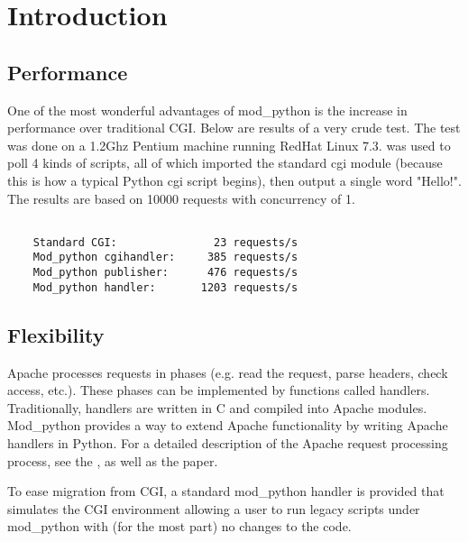 \chapter{Introduction\label{introduction}}

\section{Performance\label{intr-performance}}

One of the most wonderful advantages of mod_python is the increase in
performance over traditional CGI. Below are results of a very crude
test. The test was done on a 1.2Ghz Pentium machine running RedHat
Linux
7.3. 
was used to poll 4 kinds of scripts, all of which imported the
standard cgi module (because this is how a typical Python cgi script
begins), then output a single word "Hello!". The results are based on
10000 requests with concurrency of 1.

\begin{verbatim}

    Standard CGI:               23 requests/s
    Mod_python cgihandler:     385 requests/s
    Mod_python publisher:      476 requests/s
    Mod_python handler:       1203 requests/s

\end{verbatim}         

\section{Flexibility\label{intr-flexibility}}

Apache processes requests in phases (e.g. read the request, parse
headers, check access, etc.). These phases can be implemented by
functions called handlers. Traditionally, handlers are written in C
and compiled into Apache modules. Mod_python provides a way to extend
Apache functionality by writing Apache handlers in Python. For a
detailed description of the Apache request processing process, see the
, as well
as the  paper. 

To ease migration from CGI, a standard mod_python handler is provided
that simulates the CGI environment allowing a user to run legacy scripts
under mod_python with (for the most part) no changes to the code.
 
